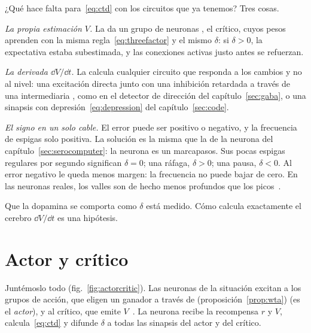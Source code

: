 ¿Qué hace falta para~\eqref{eq:ctd} con los circuitos que ya tenemos? Tres cosas.

\emph{La propia estimación $V$.} La da un grupo de neuronas , el crítico, cuyos pesos aprenden con la misma regla~\eqref{eq:threefactor} y el mismo $\delta$: si $\delta>0$, la expectativa estaba subestimada, y las conexiones activas justo antes se refuerzan.

\emph{La derivada $\dd V/\dd t$.} La calcula cualquier circuito que responda a los cambios y no al nivel: una excitación directa junto con una inhibición retardada a través de una intermediaria , como en el detector de dirección del capítulo~\ref{sec:gaba}, o una sinapsis con depresión~\eqref{eq:depression} del capítulo~\ref{sec:code}.

\emph{El signo en un solo cable.} El error puede ser positivo o negativo, y la frecuencia de espigas solo positiva. La solución es la misma que la de la neurona  del capítulo~\ref{sec:serocomputer}: la neurona  es un marcapasos. Sus pocas espigas regulares por segundo significan $\delta=0$; una ráfaga, $\delta>0$; una pausa, $\delta<0$. Al error negativo le queda menos margen: la frecuencia no puede bajar de cero. En las neuronas  reales, los valles son de hecho menos profundos que los picos~\cite{Bayer2005}.

Que la dopamina se comporta como $\delta$ está medido. Cómo calcula exactamente el cerebro $\dd V/\dd t$ es una hipótesis.

\section{Actor y crítico}

Juntémoslo todo (fig.~\ref{fig:actorcritic}). Las neuronas de la situación excitan a los grupos de acción, que eligen un ganador a través de  (proposición~\ref{prop:wta}) (es el \emph{actor}), y al crítico, que emite $V$~\cite{SuttonBarto2018}. La neurona  recibe la recompensa $r$ y $V$, calcula~\eqref{eq:ctd} y difunde $\delta$ a todas las sinapsis del actor y del crítico.

